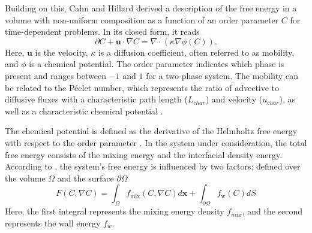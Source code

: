 Building on this, Cahn and Hillard \cite{johnw.FreeEnergyNonuniform1958} derived a description of the free energy in a volume with non-uniform composition as a function of an order parameter $C$ for time-dependent problems. In its closed form, it reads
\begin{equation}
\label{eq: CahnHillard}
    \partial C + \textbf{u} \cdot \nabla C = \nabla \cdot \left(\kappa \nabla \phi(C)\right).
\end{equation}
Here, $\textbf{u}$ is the velocity, $\kappa$ is a diffusion coefficient, often referred to as mobility, and $\phi$ is a chemical potential. The order parameter indicates which phase is present and ranges between $-1$ and $1$ for a two-phase system. The mobility can be related to the Péclet number, which represents the ratio of advective to diffusive fluxes with a characteristic path length ($L_{char}$) and velocity ($u_{char}$), as well as a characteristic chemical potential \cite{cai2015NumericalSimulationWetting,holzinger2021DirectNumericalSimulation}.

The chemical potential is defined as the derivative of the Helmholtz free energy with respect to the order parameter \cite{johnw.FreeEnergyNonuniform1958}. In the system under consideration, the total free energy consists of the mixing energy and the interfacial density energy. According to \cite{yue2010SharpinterfaceLimitCahn}, the system's free energy is influenced by two factors; defined over the volume $\Omega$ and the surface $\partial\Omega$ 
\begin{equation}
    F(C, \nabla C) = \int_{\Omega} f_{\mathrm{mix}} (C, \nabla C) d\textbf{x}+ \int_{\partial\Omega}f_\mathrm{w}(C) dS
\end{equation}
Here, the first integral represents the mixing energy density $f_{mix}$, and the second represents the wall energy $f_w$.


